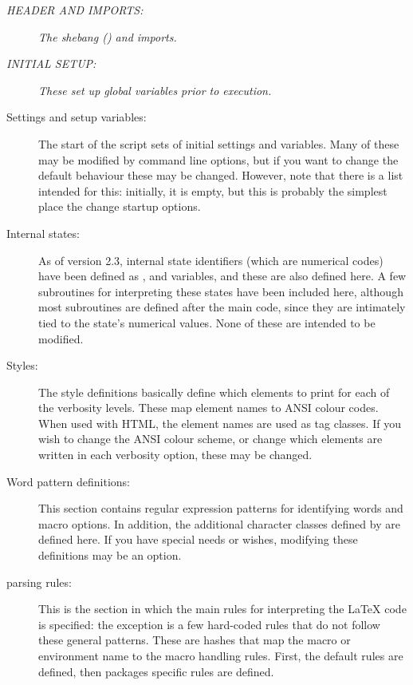 \documentclass{article}
\begin{document}
\begin{description}

\item[\em HEADER AND IMPORTS:] \textit{The shebang (\code{\#!}) and  imports.}

\item[\em INITIAL SETUP:] \textit{These set up global variables prior to execution.}

\item[Settings and setup variables:] The start of the script sets of initial settings and variables. Many of these may be modified by command line options, but if you want to change the default behaviour these may be changed. However, note that there is a list  intended for this: initially, it is empty, but this is probably the simplest place the change startup options.

\item[Internal states:] As of version 2.3, internal state identifiers (which are numerical codes) have been defined as ,  and  variables, and these are also defined here. A few subroutines for interpreting these states have been included here, although most subroutines are defined after the main code, since they are intimately tied to the state's numerical values. None of these are intended to be modified.

\item[Styles:] The style definitions basically define which elements to print for each of the verbosity levels. These map element names to ANSI colour codes. When used with HTML, the element names are used as tag classes. If you wish to change the ANSI colour scheme, or change which elements are written in each verbosity option, these may be changed.

\item[Word pattern definitions:] This section contains regular expression patterns for identifying words and macro options. In addition, the additional character classes defined by \TeXcount{} are defined here. If you have special needs or wishes, modifying these definitions may be an option.

\item[\TeXcount{} parsing rules:] This is the section in which the main rules for interpreting the \LaTeX{} code is specified: the exception is a few hard-coded rules that do not follow these general patterns. These are hashes that map the macro or environment name to the macro handling rules. First, the default rules are defined, then packages specific rules are defined.


\end{description}
\end{document}
